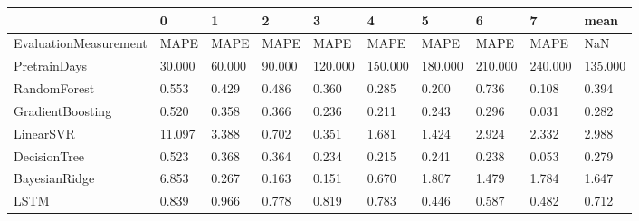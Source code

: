 \begin{tabular}{llllllllll}
\toprule
{} &      0 &      1 &      2 &       3 &       4 &       5 &       6 &       7 &    mean \\
\midrule
EvaluationMeasurement &   MAPE &   MAPE &   MAPE &    MAPE &    MAPE &    MAPE &    MAPE &    MAPE &     NaN \\
PretrainDays          & 30.000 & 60.000 & 90.000 & 120.000 & 150.000 & 180.000 & 210.000 & 240.000 & 135.000 \\
RandomForest          &  0.553 &  0.429 &  0.486 &   0.360 &   0.285 &   0.200 &   0.736 &   0.108 &   0.394 \\
GradientBoosting      &  0.520 &  0.358 &  0.366 &   0.236 &   0.211 &   0.243 &   0.296 &   0.031 &   0.282 \\
LinearSVR             & 11.097 &  3.388 &  0.702 &   0.351 &   1.681 &   1.424 &   2.924 &   2.332 &   2.988 \\
DecisionTree          &  0.523 &  0.368 &  0.364 &   0.234 &   0.215 &   0.241 &   0.238 &   0.053 &   0.279 \\
BayesianRidge         &  6.853 &  0.267 &  0.163 &   0.151 &   0.670 &   1.807 &   1.479 &   1.784 &   1.647 \\
LSTM                  &  0.839 &  0.966 &  0.778 &   0.819 &   0.783 &   0.446 &   0.587 &   0.482 &   0.712 \\
\bottomrule
\end{tabular}
